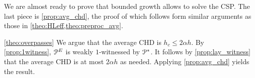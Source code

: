 We are almost ready to prove that bounded growth allows to solve the CSP.
The last piece is \cref{prop:avg_chd}, the proof of which follows form similar arguments as those in \cref{theo:HLeff,theo:preproc_avg}.


\begin{proofof}{\cref{theo:overpasses}}
We argue that the average CHD is $h_c\leq 2\alpha h$.
By \cref{prop:1witness}, $\mathcal{P}^E$ is weakly $1$-witnessed by $\mathcal{P}^*$.
It follows by \cref{prop:lay_witness} that the average CHD is at most $2\alpha h$ as needed.
Applying \cref{prop:avg_chd} yields the result.
\end{proofof}